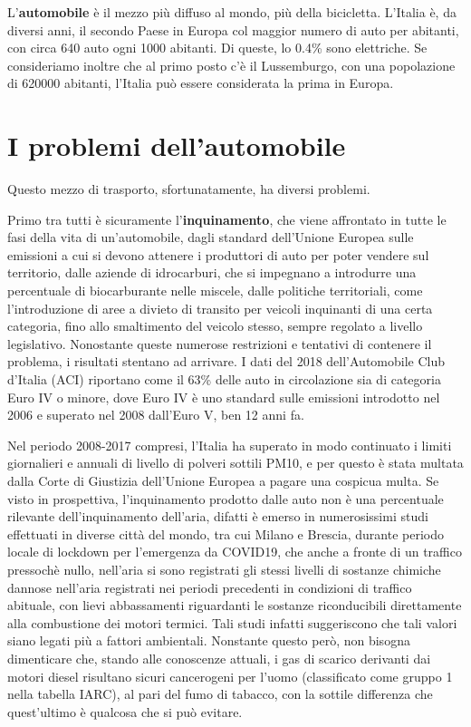 L'\textbf{automobile} è il mezzo più diffuso al mondo, più della bicicletta. L'Italia è, da diversi anni, il secondo Paese in Europa col maggior numero di auto per abitanti, con circa 640 auto ogni 1000 abitanti\cite{eurostatcars}. Di queste, lo 0.4\% sono elettriche\cite{anfiastudiestatistiche}. Se consideriamo inoltre che al primo posto c'è il Lussemburgo, con una popolazione di 620000 abitanti, l'Italia può essere considerata la prima in Europa. 

\section{I problemi dell'automobile}

Questo mezzo di trasporto, sfortunatamente, ha diversi problemi.

Primo tra tutti è sicuramente l'\textbf{inquinamento}, che viene affrontato in tutte le fasi della vita di un'automobile, dagli standard dell'Unione Europea sulle emissioni a cui si devono attenere i produttori di auto per poter vendere sul territorio, dalle aziende di idrocarburi, che si impegnano a introdurre una percentuale di biocarburante nelle miscele, dalle politiche territoriali, come l'introduzione di aree a divieto di transito per veicoli inquinanti di una certa categoria, fino allo smaltimento del veicolo stesso, sempre regolato a livello legislativo. Nonostante queste numerose restrizioni e tentativi di contenere il problema, i risultati stentano ad arrivare. I dati del 2018 dell'Automobile Club d'Italia (ACI) riportano come il 63\% delle auto in circolazione sia di categoria Euro IV o minore\cite{anfiastudiestatistiche}, dove Euro IV è uno standard sulle emissioni introdotto nel 2006 e superato nel 2008 dall'Euro V, ben 12 anni fa\cite{euroivstandard}.

\cite{trentini2014}

 Nel periodo 2008-2017 compresi, l'Italia ha superato in modo continuato i limiti giornalieri e annuali di livello di polveri sottili PM10, e per questo è stata multata dalla Corte di Giustizia dell'Unione Europea a pagare una cospicua multa\cite{eunewssanzioneitalia}. Se visto in prospettiva, l'inquinamento prodotto dalle auto non è una percentuale rilevante dell'inquinamento dell'aria, difatti è emerso in numerosissimi studi effettuati in diverse città del mondo, tra cui Milano e Brescia\cite{collivignarelli2020}\cite{camaletti2020}, durante periodo locale di lockdown per l'emergenza da COVID19, che anche a fronte di un traffico pressochè nullo, nell'aria si sono registrati gli stessi livelli di sostanze chimiche dannose nell'aria registrati nei periodi precedenti in condizioni di traffico abituale, con lievi abbassamenti riguardanti le sostanze riconducibili direttamente alla combustione dei motori termici. Tali studi infatti suggeriscono che tali valori siano legati più a fattori ambientali. Nonstante questo però, non bisogna dimenticare che, stando alle conoscenze attuali, i gas di scarico derivanti dai motori diesel risultano sicuri cancerogeni per l'uomo (classificato come gruppo 1 nella tabella IARC), al pari del fumo di tabacco, con la sottile differenza che quest'ultimo è qualcosa che si può evitare\cite{iarctable}.




